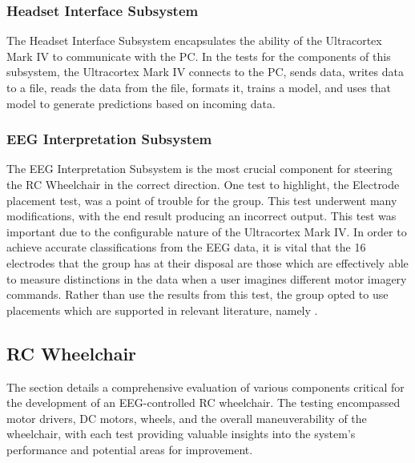 \documentclass[conference]{IEEEtran}
\begin{document}
        \subsubsection{Headset Interface Subsystem}
        The Headset Interface Subsystem encapsulates the ability of the Ultracortex Mark IV to communicate with the PC. In the tests for the components of this subsystem, the Ultracortex Mark IV connects to the PC, sends data, writes data to a file, reads the data from the file, formats it, trains a model, and uses that model to generate predictions based on incoming data.  
        
        \subsubsection{EEG Interpretation Subsystem}
        The EEG Interpretation Subsystem is the most crucial component for steering the RC Wheelchair in the correct direction. One test to highlight, the Electrode placement test, was a point of trouble for the group. This test underwent many modifications, with the end result producing an incorrect output. This test was important due to the configurable nature of the Ultracortex Mark IV. In order to achieve accurate classifications from the EEG data, it is vital that the 16 electrodes that the group has at their disposal are those which are effectively able to measure distinctions in the data when a user imagines different motor imagery commands. Rather than use the results from this test, the group opted to use placements which are supported in relevant literature, namely \cite{method_of_electrode_selection, usable_out_of_box} .

    \subsection{RC Wheelchair}
    The section details a comprehensive evaluation of various components critical for the development of an EEG-controlled RC wheelchair. The testing encompassed motor drivers, DC motors, wheels, and the overall maneuverability of the wheelchair, with each test providing valuable insights into the system's performance and potential areas for improvement.
\end{document}
